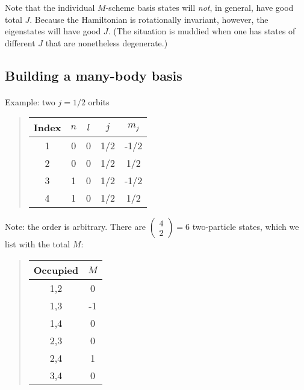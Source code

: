 \documentclass[%
twoside,                 %
final,                   %
10pt]{article}
\begin{document}
\noindent
Note that the individual $M$-scheme basis states will \emph{not}, in general, 
have good total $J$. 
Because the Hamiltonian is rotationally invariant, however, the eigenstates will 
have good $J$. (The situation is muddied when one has states of different $J$ that are 
nonetheless degenerate.)




\subsection{Building a many-body basis}

\paragraph{}
Example: two $j=1/2$ orbits


\begin{quote}
\begin{tabular}{ccccc}
\hline
\multicolumn{1}{c}{ Index } & \multicolumn{1}{c}{ $n$ } & \multicolumn{1}{c}{ $l$ } & \multicolumn{1}{c}{ $j$ } & \multicolumn{1}{c}{ $m_j$ } \\
\hline
1     & 0   & 0   & 1/2 & -1/2  \\
2     & 0   & 0   & 1/2 & 1/2   \\
3     & 1   & 0   & 1/2 & -1/2  \\
4     & 1   & 0   & 1/2 & 1/2   \\
\hline
\end{tabular}
\end{quote}

\noindent
Note: the order is arbitrary.
There are $\left ( \begin{array}{c} 4 \\ 2 \end{array} \right) = 6$ two-particle states, 
which we list with the total $M$:


\begin{quote}
\begin{tabular}{cc}
\hline
\multicolumn{1}{c}{ Occupied } & \multicolumn{1}{c}{ $M$ } \\
\hline
1,2      & 0   \\
1,3      & -1  \\
1,4      & 0   \\
2,3      & 0   \\
2,4      & 1   \\
3,4      & 0   \\
\hline
\end{tabular}
\end{quote}
\end{document}

